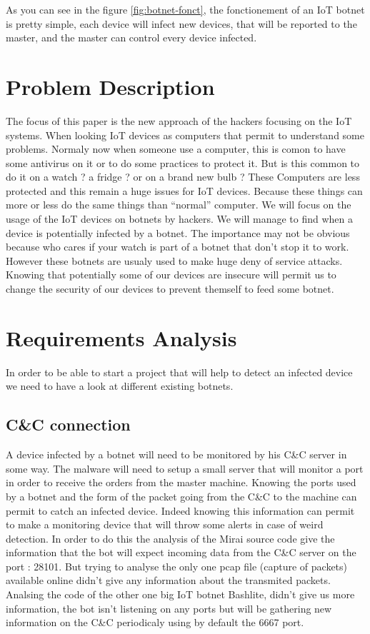 \documentclass{report}
\begin{document}
As you can see in the figure \ref{fig:botnet-fonct}, the fonctionement of an IoT botnet is pretty simple, each device will infect new devices, that will be reported to the master, and the master can control every device infected.

\chapter{Problem Description}
The focus of this paper is the new approach of the hackers focusing on the IoT systems. When looking IoT devices as computers that permit to understand some problems. Normaly now when someone use a computer, this is comon to have some antivirus on it or to do some practices to protect it. But is this common to do it on a watch ? a fridge ? or on a brand new bulb ? These Computers are less protected and this remain a huge issues for IoT devices\autocite{yang2017survey}. Because these things can more or less do the same things than ``normal'' computer. We will focus on the usage of the IoT devices on botnets by hackers. We will manage to find when a device is potentially infected by a botnet. The importance may not be obvious because who cares if your watch is part of a botnet that don't stop it to work. However these botnets are usualy used to make huge deny of service attacks\autocite{hallman2017ioddos}. Knowing that potentially some of our devices are insecure will permit us to change the security of our devices to prevent themself to feed some botnet.\newline

\chapter{Requirements Analysis}
In order to be able to start a project that will help to detect an infected device we need to have a look at different existing botnets.

\section{C\&C connection}
A device infected by a botnet will need to be monitored by his C\&C server in some way. The malware will need to setup a small server that will monitor a port in order to receive the orders from the master machine. Knowing the ports used by a botnet and the form of the packet going from the C\&C to the machine can permit to catch an infected device. Indeed knowing this information can permit to make a monitoring device that will throw some alerts in case of weird detection.\newline
In order to do this the analysis of the Mirai source code give the information that the bot will expect incoming data from the C\&C server on the port : 28101.
But trying to analyse the only one pcap file (capture of packets) available online didn't give any information about the transmited packets.
Analsing the code of the other one big IoT botnet Bashlite, didn't give us more information, the bot isn't listening on any ports but will be gathering new information on the C\&C periodicaly using by default the 6667 port.
\end{document}
